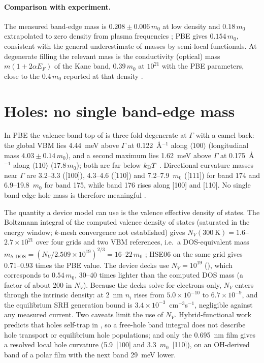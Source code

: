 \paragraph{Comparison with experiment.} The measured band-edge mass is $0.208\pm0.006\,m_0$ at low density
\citep[p.~225102-1]{Stokey2021} and $0.18\,m_0$ extrapolated to zero density from plasma frequencies \citep{Feneberg2016};
PBE gives $0.154\,m_0$, consistent with the general underestimate of masses by semi-local functionals. At degenerate
filling the relevant mass is the conductivity (optical) mass $m(1+2\alpha E_F)$ of the Kane band, $0.39\,m_0$ at
$10^{21}$\cmcu{} with the PBE parameters, close to the $0.4\,m_0$ reported at that density \citep{Feneberg2016}.

\section{Holes: no single band-edge mass}
\label{sec:mono-mass-holes}

In PBE the valence-band top of \InO{} is three-fold degenerate at $\Gamma$ with a camel back: the global VBM lies
4.44~meV above $\Gamma$ at 0.122~\AA$^{-1}$ along $\langle100\rangle$ (longitudinal mass $4.03\pm0.14\,m_0$), and a second
maximum lies 1.62~meV above $\Gamma$ at 0.175~\AA$^{-1}$ along $\langle110\rangle$ ($17.8\,m_0$); both are far below
$k_{\mathrm{B}}T$ . Directional curvature masses near $\Gamma$ are 3.2--3.3 ([100]), 4.3--4.6 ([110]) and 7.2--7.9~$m_0$
([111]) for band 174 and 6.9--19.8~$m_0$ for band 175, while band 176 rises along [100] and [110]. No single band-edge
hole mass is therefore meaningful .

The quantity a device model can use is the valence effective density of states. The Boltzmann integral of the computed
valence density of states (saturated in the energy window; $k$-mesh convergence not established) gives
$N_V(300~\mathrm{K}) = 1.6$--$2.7\times10^{21}$\cmcu{} over four grids and two VBM references, i.e.\ a DOS-equivalent mass
$m_{h,\mathrm{DOS}} = (N_V/2.509\times10^{19})^{2/3} = 16$--$22\,m_0$  ; HSE06 on the same grid gives
0.71--0.93 times the PBE value. The device decks use $N_V = 10^{19}$\cmcu{} (), which corresponds to
$0.54\,m_0$, 30--40 times lighter than the computed DOS mass (a factor of about 200 in $N_V$). Because the decks solve for electrons only, $N_V$ enters
through the intrinsic density: at 2~nm $n_i$ rises from $5.0\times10^{-10}$ to $6.7\times10^{-9}$\cmcu{}, and the
equilibrium SRH generation bound is $3.4\times10^{-3}$~cm$^{-3}$s$^{-1}$, negligible against any measured current.
Two caveats limit the use of $N_V$. Hybrid-functional work predicts that holes self-trap in \InO{} \citep{Varley2012},
so a free-hole band integral does not describe hole transport or equilibrium hole populations; and only the 0.695~nm
film gives a resolved local hole curvature (5.9~[100] and 3.3~$m_0$~[110]), on an OH-derived band of a polar film with the
next band 29~meV lower.

